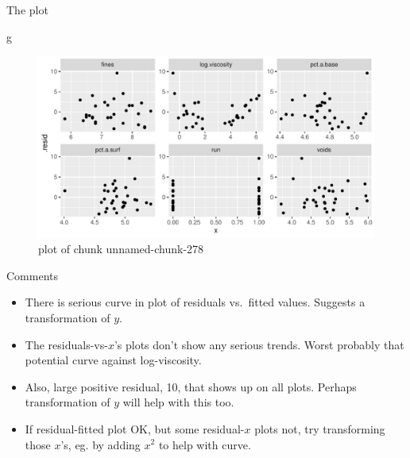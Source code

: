 \documentclass[ignorenonframetext,]{beamer}
\newenvironment{Shaded}{\begin{snugshade}}{\end{snugshade}}
\newcommand{\NormalTok}[1]{#1}
\providecommand{\tightlist}{%
  \setlength{\itemsep}{0pt}\setlength{\parskip}{0pt}}
\begin{document}
\begin{frame}[fragile]{The plot}
\protect\hypertarget{the-plot-3}{}

\begin{Shaded}
\begin{Highlighting}[]
\NormalTok{g}
\end{Highlighting}
\end{Shaded}

\begin{figure}
\centering
\includegraphics{figure/unnamed-chunk-278-1.pdf}
\caption{plot of chunk unnamed-chunk-278}
\end{figure}

\end{frame}

\begin{frame}{Comments}
\protect\hypertarget{comments-20}{}

\begin{itemize}
\tightlist
\item
  There is serious curve in plot of residuals vs.~fitted values.
  Suggests a transformation of \(y\).
\item
  The residuals-vs-\(x\)'s plots don't show any serious trends. Worst
  probably that potential curve against log-viscosity.
\item
  Also, large positive residual, 10, that shows up on all plots. Perhaps
  transformation of \(y\) will help with this too.
\item
  If residual-fitted plot OK, but some residual-\(x\) plots not, try
  transforming those \(x\)'s, eg. by adding \(x^2\) to help with curve.
\end{itemize}

\end{frame}
\end{document}
